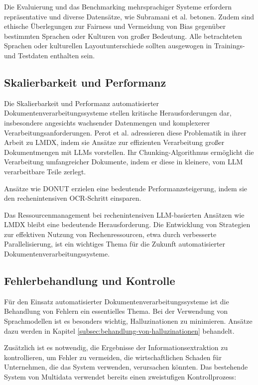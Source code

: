 Die Evaluierung und das Benchmarking mehrsprachiger Systeme erfordern repräsentative und diverse Datensätze, wie Subramani et al. \cite{SubramaniNishant2021ASoD} betonen. Zudem sind ethische Überlegungen zur Fairness und Vermeidung von Bias gegenüber bestimmten Sprachen oder Kulturen von großer Bedeutung. Alle betrachteten Sprachen oder kulturellen Layoutunterschiede sollten ausgewogen in Trainings- und Testdaten enthalten sein.

\subsection{Skalierbarkeit und Performanz}
\label{subsec:skalierbarkeit-und-performanz}

Die Skalierbarkeit und Performanz automatisierter Dokumentenverarbeitungssysteme stellen kritische Herausforderungen dar, insbesondere angesichts wachsender Datenmengen und komplexerer Verarbeitungsanforderungen. Perot et al. \cite{PerotVincent2024LLMD} adressieren diese Problematik in ihrer Arbeit zu \gls{LMDX}, indem sie Ansätze zur effizienten Verarbeitung großer Dokumentmengen mit \glspl{LLM} vorstellen. Ihr Chunking-Algorithmus ermöglicht die Verarbeitung umfangreicher Dokumente, indem er diese in kleinere, vom \gls{LLM} verarbeitbare Teile zerlegt.

Ansätze wie \gls{DONUT} \cite{KimGeewook2022ODUT} erzielen eine bedeutende Performanzsteigerung, indem sie den rechenintensiven \gls{OCR}-Schritt einsparen.

Das Ressourcenmanagement bei rechenintensiven \gls{LLM}-basierten Ansätzen wie \gls{LMDX} \cite{PerotVincent2024LLMD} bleibt eine bedeutende Herausforderung. Die Entwicklung von Strategien zur effektiven Nutzung von Rechenressourcen, etwa durch verbesserte Parallelisierung, ist ein wichtiges Thema für die Zukunft automatisierter Dokumentenverarbeitungssysteme.

\subsection{Fehlerbehandlung und Kontrolle}
\label{subsec:fehlerbehandlung-und-kontrolle}

Für den Einsatz automatisierter Dokumentenverarbeitungssysteme ist die Behandlung von Fehlern ein essentielles Thema. Bei der Verwendung von Sprachmodellen ist es besonders wichtig, Halluzinationen zu minimieren. Ansätze dazu werden in Kapitel \ref{subsec:behandlung-von-halluzinationen} behandelt.

Zusätzlich ist es notwendig, die Ergebnisse der Informationsextraktion zu kontrollieren, um Fehler zu vermeiden, die wirtschaftlichen Schaden für Unternehmen, die das System verwenden, verursachen könnten. Das bestehende System von Multidata verwendet bereits einen zweistufigen Kontrollprozess:

